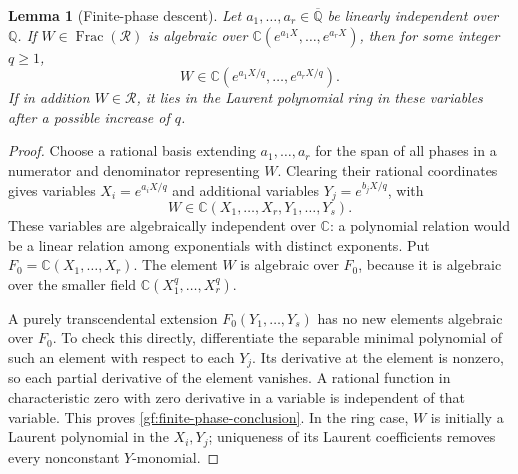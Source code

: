 \documentclass[11pt,a4paper]{article}
\numberwithin{equation}{section}
\newtheorem{lemma}[theorem]{Lemma}
\theoremstyle{definition}
\theoremstyle{remark}
\newcommand{\A}{\overline{\mathbb Q}}
\begin{document}
\begin{lemma}[Finite-phase descent]\label{gf:phase-descent}
Let $a_1,\ldots,a_r\in\A$ be linearly independent over $\mathbb Q$.
If $W\in\operatorname{Frac}(\mathcal R)$ is algebraic over
$\mathbb C(e^{a_1X},\ldots,e^{a_rX})$, then for some integer $q\ge1$,
\begin{equation}\label{gf:finite-phase-conclusion}
 W\in\mathbb C(e^{a_1X/q},\ldots,e^{a_rX/q}).
\end{equation}
If in addition $W\in\mathcal R$, it lies in the Laurent polynomial
ring in these variables after a possible increase of $q$.
\end{lemma}
\begin{proof}
Choose a rational basis extending $a_1,\ldots,a_r$ for the span of all
phases in a numerator and denominator representing $W$.  Clearing
their rational coordinates gives variables
$X_i=e^{a_iX/q}$ and additional variables $Y_j=e^{b_jX/q}$, with
\[
 W\in\mathbb C(X_1,\ldots,X_r,Y_1,\ldots,Y_s).
\]
These variables are algebraically independent over $\mathbb C$:
a polynomial relation would be a linear relation among exponentials
with distinct exponents.  Put $F_0=\mathbb C(X_1,\ldots,X_r)$.
The element $W$ is algebraic over $F_0$, because it is algebraic over
the smaller field $\mathbb C(X_1^q,\ldots,X_r^q)$.

A purely transcendental extension $F_0(Y_1,\ldots,Y_s)$ has no new
elements algebraic over $F_0$.  To check this directly, differentiate
the separable minimal polynomial of such an element with respect to
each $Y_j$.  Its derivative at the element is nonzero, so each partial
derivative of the element vanishes.  A rational function in
characteristic zero with zero derivative in a variable is independent
of that variable.  This proves \eqref{gf:finite-phase-conclusion}.
In the ring case, $W$ is initially a Laurent polynomial in the $X_i,Y_j$;
uniqueness of its Laurent coefficients removes every nonconstant
$Y$-monomial.
\end{proof}
\end{document}
